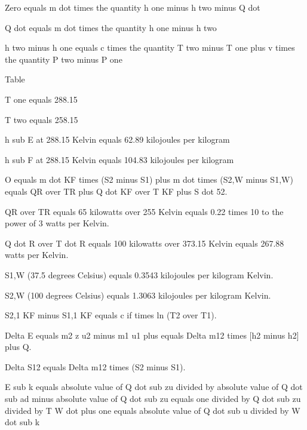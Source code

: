 Zero equals m dot times the quantity h one minus h two minus Q dot

Q dot equals m dot times the quantity h one minus h two

h two minus h one equals c times the quantity T two minus T one plus v times the quantity P two minus P one

Table

T one equals 288.15

T two equals 258.15

h sub E at 288.15 Kelvin equals 62.89 kilojoules per kilogram

h sub F at 288.15 Kelvin equals 104.83 kilojoules per kilogram

O equals m dot KF times (S2 minus S1) plus m dot times (S2,W minus S1,W) equals QR over TR plus Q dot KF over T KF plus S dot 52.

QR over TR equals 65 kilowatts over 255 Kelvin equals 0.22 times 10 to the power of 3 watts per Kelvin.

Q dot R over T dot R equals 100 kilowatts over 373.15 Kelvin equals 267.88 watts per Kelvin.

S1,W (37.5 degrees Celsius) equals 0.3543 kilojoules per kilogram Kelvin.

S2,W (100 degrees Celsius) equals 1.3063 kilojoules per kilogram Kelvin.

S2,1 KF minus S1,1 KF equals c if times ln (T2 over T1).

Delta E equals m2 z u2 minus m1 u1 plus equals Delta m12 times [h2 minus h2] plus Q.

Delta S12 equals Delta m12 times (S2 minus S1).

E sub k equals absolute value of Q dot sub zu divided by absolute value of Q dot sub ad minus absolute value of Q dot sub zu equals one divided by Q dot sub zu divided by T W dot plus one equals absolute value of Q dot sub u divided by W dot sub k